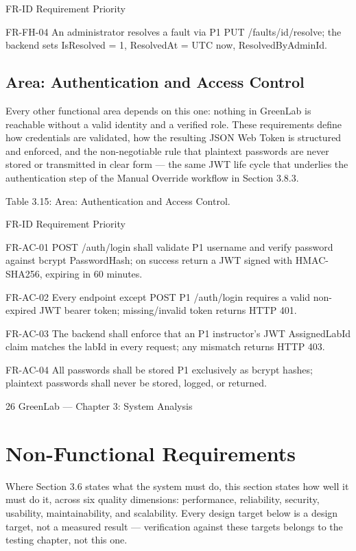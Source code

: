 FR-ID Requirement Priority

FR-FH-04 An administrator resolves a fault via P1
PUT /faults/{id}/resolve; the backend
sets IsResolved = 1, ResolvedAt =
UTC now, ResolvedByAdminId.


\subsection{Area: Authentication and Access Control}

Every other functional area depends on this one: nothing in GreenLab is reachable without a valid
identity and a verified role. These requirements define how credentials are validated, how the
resulting JSON Web Token is structured and enforced, and the non-negotiable rule that plaintext
passwords are never stored or transmitted in clear form --- the same JWT life cycle that underlies
the authentication step of the Manual Override workflow in Section 3.8.3.

Table 3.15: Area: Authentication and Access Control.

FR-ID Requirement Priority

FR-AC-01 POST /auth/login shall validate P1
username and verify password against
bcrypt PasswordHash; on success
return a JWT signed with HMAC-
SHA256, expiring in 60 minutes.

FR-AC-02 Every endpoint except POST P1
/auth/login requires a valid non-
expired JWT bearer token;
missing/invalid token returns HTTP
401.

FR-AC-03 The backend shall enforce that an P1
instructor's JWT AssignedLabId claim
matches the labId in every request; any
mismatch returns HTTP 403.

FR-AC-04 All passwords shall be stored P1
exclusively as bcrypt hashes; plaintext
passwords shall never be stored,
logged, or returned.



26
GreenLab --- Chapter 3: System Analysis



\section{Non-Functional Requirements}

Where Section 3.6 states what the system must do, this section states how well it must do it, across
six quality dimensions: performance, reliability, security, usability, maintainability, and scalability.
Every design target below is a design target, not a measured result --- verification against these
targets belongs to the testing chapter, not this one.

